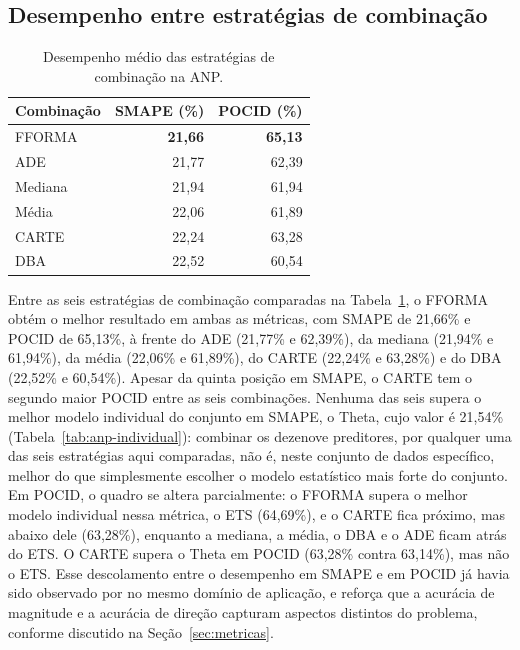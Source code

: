 \subsection{Desempenho entre estratégias de combinação}

\begin{table}[H]
\centering
\caption{Desempenho médio das estratégias de combinação na ANP.}
\label{tab:anp-estaticas}
\begin{tabular}{@{}lrr@{}}
\toprule
\textbf{Combinação} & \textbf{SMAPE (\%)} & \textbf{POCID (\%)} \\
\midrule
FFORMA & \textbf{21,66} & \textbf{65,13} \\
ADE    & 21,77 & 62,39 \\
Mediana & 21,94 & 61,94 \\
Média   & 22,06 & 61,89 \\
CARTE  & 22,24 & 63,28 \\
DBA     & 22,52 & 60,54 \\
\bottomrule
\end{tabular}
\end{table}

Entre as seis estratégias de combinação comparadas na Tabela~\ref{tab:anp-estaticas}, o FFORMA obtém o melhor resultado em ambas as métricas, com SMAPE de 21,66\% e POCID de 65,13\%, à frente do ADE (21,77\% e 62,39\%), da mediana (21,94\% e 61,94\%), da média (22,06\% e 61,89\%), do CARTE (22,24\% e 63,28\%) e do DBA (22,52\% e 60,54\%). Apesar da quinta posição em SMAPE, o CARTE tem o segundo maior POCID entre as seis combinações. Nenhuma das seis supera o melhor modelo individual do conjunto em SMAPE, o Theta, cujo valor é 21,54\% (Tabela~\ref{tab:anp-individual}): combinar os dezenove preditores, por qualquer uma das seis estratégias aqui comparadas, não é, neste conjunto de dados específico, melhor do que simplesmente escolher o modelo estatístico mais forte do conjunto. Em POCID, o quadro se altera parcialmente: o FFORMA supera o melhor modelo individual nessa métrica, o ETS (64,69\%), e o CARTE fica próximo, mas abaixo dele (63,28\%), enquanto a mediana, a média, o DBA e o ADE ficam atrás do ETS. O CARTE supera o Theta em POCID (63,28\% contra 63,14\%), mas não o ETS. Esse descolamento entre o desempenho em SMAPE e em POCID já havia sido observado por \citet{krause2026foundation} no mesmo domínio de aplicação, e reforça que a acurácia de magnitude e a acurácia de direção capturam aspectos distintos do problema, conforme discutido na Seção~\ref{sec:metricas}.

